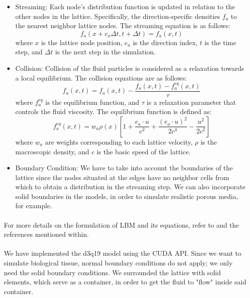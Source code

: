 \begin{itemize}
	\item Streaming: Each node's distribution function is updated in relation to the other nodes in the lattice. Specifically, the direction-specific densities $f_a$ to the nearest neighbor lattice nodes. The streaming equation is as follows:
	\begin{equation}
		f_a(x + e_a \Delta t, t + \Delta t) = f_a(x,t)
	\end{equation}
	where $x$ is the lattice node position, $e_a$ is the direction index, $t$ is the time step, and $\Delta t$ is the next step in the simulation.
	\item Collision: Collision of the fluid particles is considered as a relaxation towards a local equilibrium. The collision equations are as follows:
	\begin{equation}
		f_a(x,t) = f_a(x,t) - \frac{f_a(x,t)-f_a^{eq}(x,t)}{\tau}
	\end{equation}
	where $f_a^{eq}$ is the equilibrium function, and $\tau$ is a relaxation parameter that controls the fluid viscosity. The equilibrium function is defined as:
	\begin{equation}
		f_a^{eq}(x,t) = w_a \rho(x)[1 + \frac{e_a \cdot u}{c^2} + \frac{(e_a \cdot u)^2}{2 c^4} - \frac{u^2}{2 c^2}]
	\end{equation}
	where $w_a$ are weights corresponding to each lattice velocity, $\rho$ is the macroscopic density, and $c$ is the basic speed of the lattice.
	\item Boundary Condition: We have to take into account the boundaries of the lattice since the nodes situated at the edges have no neighbor cells from which to obtain a distribution in the streaming step. We can also incorporate solid boundaries in the models, in order to simulate realistic porous media, for example.
\end{itemize} 

\paragraph{}For more details on the formulation of LBM and its equations, refer to \citep{sukop2006lattice, rinaldi2011modelos} and the references mentioned within.

\paragraph{}We have implemented the d3q19 model using the CUDA API. Since we want to simulate biological tissue, normal boundary conditions do not apply; we only need the solid boundary conditions. We surrounded the lattice with solid elements, which serve as a container, in order to get the fluid to "flow" inside said container. 

